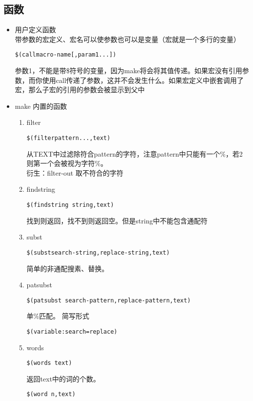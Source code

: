 \subsection{函数}
	\begin{itemize}
		\item 用户定义函数\\
		带参数的宏定义、宏名可以使参数也可以是变量（宏就是一个多行的变量）
\begin{lstlisting}[numbers = none]
$(callmacro-name[,param1...])
\end{lstlisting}	 	
		参数1，不能是带\$符号的变量，因为make将会将其值传递。如果宏没有引用参数，而你使用call传递了参数，这并不会发生什么。如果宏定义中嵌套调用了宏，那么子宏的引用的参数会被显示到父中
		\item make 内置的函数\\
		\begin{enumerate}
			\item filter
\begin{lstlisting}[numbers = none]
	$(filterpattern...,text)
\end{lstlisting}				
			从TEXT中过滤除符合pattern的字符，注意pattern中只能有一个\%，若2则第一个会被视为字符\%。\\
			衍生：filter-out 取不符合的字符 
			\item findstring
\begin{lstlisting}[numbers = none]
	$(findstring string,text)
\end{lstlisting}
			找到则返回，找不到则返回空。但是string中不能包含通配符
			\item subst 
\begin{lstlisting}[numbers = none]
	$(substsearch-string,replace-string,text)
\end{lstlisting}			
			简单的非通配搜素、替换。
			\item patsubst 
\begin{lstlisting}[numbers = none]
	$(patsubst search-pattern,replace-pattern,text)
\end{lstlisting}
			单\%匹配。
			简写形式
\begin{lstlisting}[numbers = none]
	$(variable:search=replace)
\end{lstlisting}
			\item words 
\begin{lstlisting}[numbers = none]
	$(words text)
\end{lstlisting}
			返回text中的词的个数。
\begin{lstlisting}[numbers = none]
	$(word n,text)
\end{lstlisting}

\end{enumerate}
\end{itemize}

